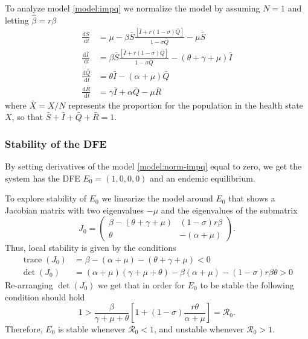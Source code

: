 \documentclass{book}
\begin{document}
To analyze model \eqref{model:impq} we normalize the model by assuming $N=1$ and letting $\hat{\beta}=r\beta$
%
\begin{equation}
\label{model:norm-impq}
\begin{split}
\frac{\mathrm{d} \bar{S}}{\mathrm{~d} t} &= \mu-\beta \bar{S} \frac{[\bar{I}+r(1-\sigma) \bar{Q}]}{1-\sigma \bar{Q}}-\mu \bar{S} \\
\frac{\mathrm{d} \bar{I}}{\mathrm{~d} t}&=\beta \bar{S} \frac{[\bar{I}+r(1-\sigma) \bar{Q}]}{1-\sigma \bar{Q}}-(\theta+\gamma+\mu) \bar{I} \\
\frac{\mathrm{d} \bar{Q}}{\mathrm{~d} t}&=\theta \bar{I}-(\alpha+\mu) \bar{Q} \\
\frac{\mathrm{d} \bar{R}}{\mathrm{~d} t}&=\gamma \bar{I}+\alpha \bar{Q}-\mu \bar{R}
\end{split}
\end{equation}
%
where $\bar{X}=X/N$ represents the proportion for the population in the health state $X$, so that $\bar{S}+\bar{I}+\bar{Q}+\bar{R}=1$.

\subsubsection*{Stability of the DFE}
By setting derivatives of the model \eqref{model:norm-impq} equal to zero, we get the system has the DFE $E_0=(1,0,0,0)$ and an endemic equilibrium.

To explore stability of $E_0$ we linearize the model around $E_0$ that shows a Jacobian matrix with two eigenvalues $-\mu$ and the eigenvalues of the submatrix
\begin{equation}
J_{0}=\left(\begin{array}{cc}
\beta-(\theta+\gamma+\mu) & (1-\sigma) r \beta \\
\theta & -(\alpha+\mu)
\end{array}\right).
\end{equation}
Thus, local stability is given by the conditions
\begin{align}
\operatorname{trace}\left(J_{0}\right)&=\beta-(\alpha+\mu)-(\theta+\gamma+\mu)<0\\
\operatorname{det}\left(J_{0}\right)&=(\alpha+\mu)(\gamma+\mu+\theta)-\beta(\alpha+\mu)-(1-\sigma) r \beta \theta>0
\end{align}
%
Re-arranging $\operatorname{det}\left(J_{0}\right)$ we get that in order for $E_0$ to be stable the following condition should hold
\begin{equation}
1>\frac{\beta}{\gamma+\mu+\theta}\left[1+(1-\sigma) \frac{r \theta}{\alpha+\mu}\right]=\mathcal{R}_0.
\end{equation}
Therefore, $E_0$ is stable whenever $\mathcal{R}_0<1$, and unstable whenever $\mathcal{R}_0>1$.
\end{document}
